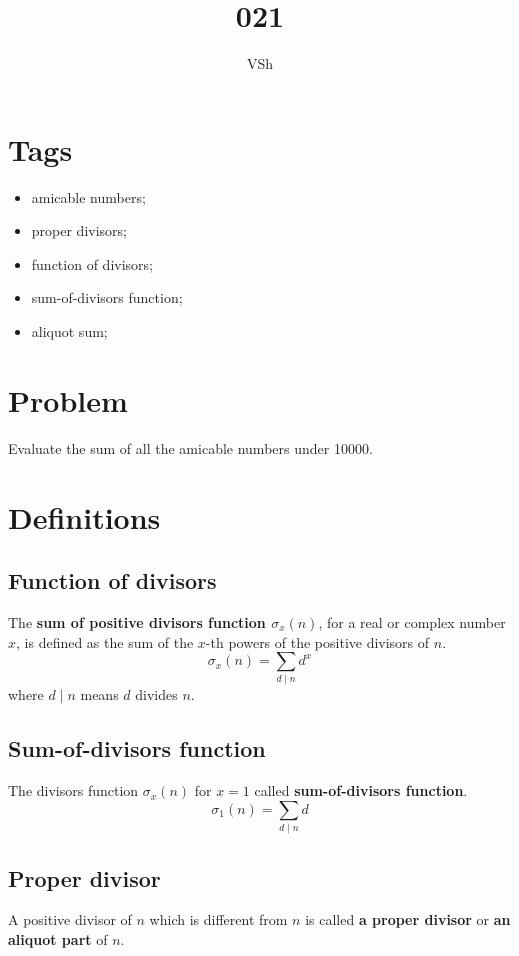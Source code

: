 \documentclass{article}
\begin{document}
\title{021}
\author{VSh}

\maketitle

\section{Tags}
\begin{itemize}
    \item amicable numbers;
    \item proper divisors;
    \item function of divisors;
    \item sum-of-divisors function;
    \item aliquot sum;
\end{itemize}

\section{Problem}
Evaluate the sum of all the amicable numbers under 10000.

\section{Definitions}
\subsection{Function of divisors}
The \textbf{sum of positive divisors function $\sigma_{x}(n)$}, for a real or complex number $x$,
is defined as the sum of the $x$-th powers of the positive divisors of $n$.
\begin{equation*}
    \sigma_{x}(n) = \sum_{d \mid n}{d^{x}}
\end{equation*}
where $d \mid n$ means $d$ divides $n$.

\subsection{Sum-of-divisors function}
The divisors function $\sigma_{x}(n)$ for $x=1$ called \textbf{sum-of-divisors function}.
\begin{equation*}
    \sigma_{1}(n) = \sum_{d \mid n}{d}
\end{equation*}

\subsection{Proper divisor}
A positive divisor of $n$ which is different from $n$ is called \textbf{a proper divisor} 
or \textbf{an aliquot part} of $n$.
\end{document}
